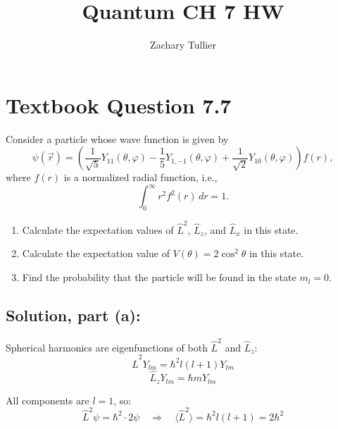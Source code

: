 \documentclass[12pt]{article}
\begin{document}
\singlespacing  %
\title{Quantum CH 7 HW}

\author[1]{Zachary Tullier}
\date{}
\maketitle

\section{Textbook Question 7.7}
        Consider a particle whose wave function is given by
        \[
            \psi(\vec{r}) = \left( \frac{1}{\sqrt{5}} Y_{11}(\theta, \varphi)
            - \frac{1}{5} Y_{1,-1}(\theta, \varphi)
            + \frac{1}{\sqrt{2}} Y_{10}(\theta, \varphi) \right) f(r),
        \]
        where \( f(r) \) is a normalized radial function, i.e.,
        \[
            \int_0^\infty r^2 f^2(r) \, dr = 1.
        \]
        
        \begin{enumerate}
            \item[(a)] Calculate the expectation values of \( \hat{L}^2 \), \( \hat{L}_z \), and \( \hat{L}_x \) in this state.
            \item[(b)] Calculate the expectation value of \( V(\theta) = 2 \cos^2 \theta \) in this state.
            \item[(c)] Find the probability that the particle will be found in the state \( m_l = 0 \).
        \end{enumerate}

    \subsection{Solution, part (a):}
        Spherical harmonics are eigenfunctions of both \( \hat{L}^2 \) and \( \hat{L}_z \):
        \[
            \hat{L}^2 Y_{lm} = \hbar^2 l(l+1) Y_{lm}
        \]
        \[
            \hat{L}_z Y_{lm} = \hbar m Y_{lm}
        \]

        All components are \( l = 1 \), so:
        \[
            \hat{L}^2 \psi = \hbar^2 \cdot 2 \psi \quad \Rightarrow \quad \langle \hat{L}^2 \rangle = \hbar^2 l(l+1) = 2\hbar^2
        \]
\end{document}
